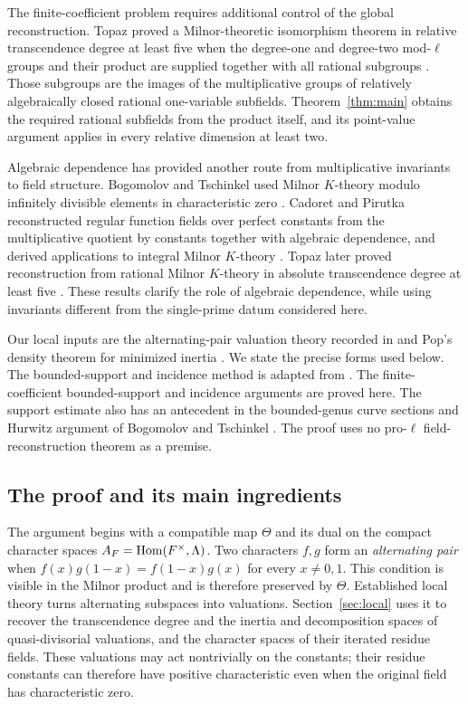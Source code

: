 The finite-coefficient problem requires additional control of the global
reconstruction. Topaz proved a Milnor-theoretic isomorphism theorem in
relative transcendence degree at least five when the degree-one and
degree-two mod-$\ell$ groups and their product are supplied together
with all rational subgroups \cite[Theorem~B]{Topaz2016}. Those subgroups
are the images of the multiplicative groups of relatively algebraically
closed rational one-variable subfields. Theorem~\ref{thm:main} obtains
the required rational subfields from the product itself, and its
point-value argument applies in every relative dimension at least two.

Algebraic dependence has provided another route from multiplicative
invariants to field structure. Bogomolov and Tschinkel used Milnor
$K$-theory modulo infinitely divisible elements in characteristic zero
\cite{BT2009}. Cadoret and Pirutka reconstructed regular function
fields over perfect constants from the multiplicative quotient by
constants together with algebraic dependence, and derived applications
to integral Milnor $K$-theory \cite{CadoretPirutka2021}. Topaz later
proved reconstruction from rational Milnor $K$-theory in absolute
transcendence degree at least five \cite{Topaz2022}. These results
clarify the role of algebraic dependence, while using invariants
different from the single-prime datum considered here.

Our local inputs are the alternating-pair valuation theory recorded in
\cite[Section~2]{Topaz2020} and Pop's density theorem for minimized
inertia \cite{Pop2015}. We state the precise forms used below.
The bounded-support and incidence method is adapted from
\cite[Sections~4--6]{InternalBP}. The finite-coefficient bounded-support
and incidence arguments are proved here. The support estimate also has an
antecedent in the bounded-genus curve sections and Hurwitz argument of
Bogomolov and Tschinkel \cite[Section~6, Proposition~6.1]{BT2011}.
The proof uses no pro-$\ell$ field-reconstruction theorem as a premise.

\subsection{The proof and its main ingredients}

The argument begins with a compatible map $\Theta$ and its dual on
the compact character spaces
$A_F=\operatorname{Hom}(F^\times,\Lambda)$. Two characters $f,g$ form an
\emph{alternating pair} when
$f(x)g(1-x)=f(1-x)g(x)$ for every $x\ne0,1$. This condition is
visible in the Milnor product and is therefore preserved by $\Theta$.
Established local theory turns alternating subspaces into valuations.
Section~\ref{sec:local} uses it to recover the transcendence degree and
the inertia and decomposition spaces of quasi-divisorial valuations,
and the character spaces of their iterated residue fields. These
valuations may act nontrivially on the constants; their residue
constants can therefore have positive characteristic even when the
original field has characteristic zero.

